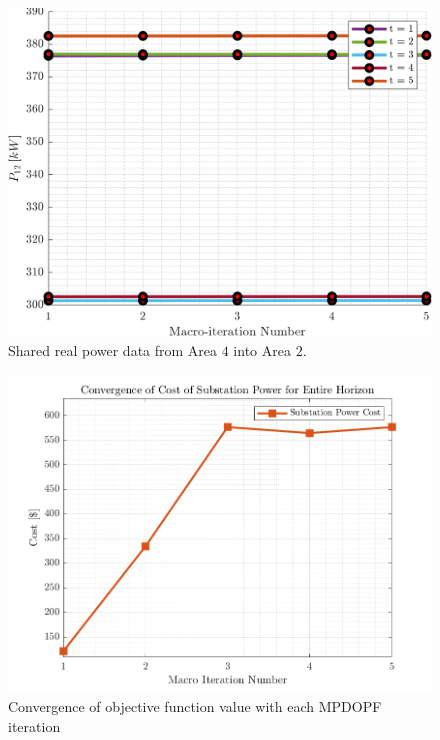 \begin{figure}[t]
    \centering
    \includegraphics[width=0.8\columnwidth]{figures/T5-pv20-batt30-genCost/dopf/convergenceCurves/BoundaryRealPower_vs_t_vs_macroItr_T_5_Areas_2_4_genCost_pv_20_batt_30_crop.png}
    \caption{Shared real power data from Area $4$ into Area $2$.}
    \label{fig:convergenceCurves-5-20-30_enapp}
    \vspace{-4mm}
\end{figure}

\begin{figure}[t]
    \centering
    \includegraphics[height=0.25\textheight]{figures/T5-pv20-batt30-genCost/dopf/outputCurves/ObjectiveConvergenceCurves_Horizon_5.png}
    \caption{Convergence of objective function value with each MPDOPF iteration}
    \label{fig:outputConvergence-5-pv20-batt30-genCost_enapp}
    \vspace{-4mm}
\end{figure}

